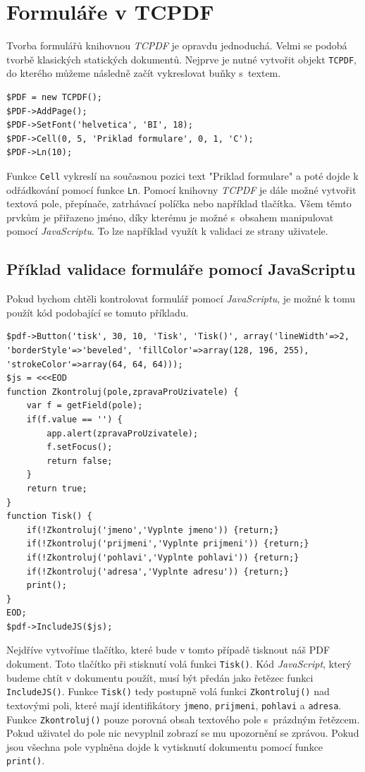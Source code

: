 \documentclass[czech,BP]{thesiskiv}
\begin{document}
\section{Formuláře v TCPDF}
Tvorba formulářů knihovnou \emph{TCPDF} je opravdu jednoduchá. Velmi se podobá tvorbě klasických statických dokumentů. Nejprve je nutné vytvořit objekt \texttt{TCPDF}, do kterého můžeme následně začít vykreslovat buňky s~textem.
\begin{lstlisting}
$PDF = new TCPDF();
$PDF->AddPage();
$PDF->SetFont('helvetica', 'BI', 18);
$PDF->Cell(0, 5, 'Priklad formulare', 0, 1, 'C');
$PDF->Ln(10);
\end{lstlisting}
Funkce \texttt{Cell} vykreslí na současnou pozici text "Priklad formulare" a poté dojde k odřádkování pomocí funkce \texttt{Ln}. Pomocí knihovny \emph{TCPDF} je dále možné vytvořit textová pole, přepínače, zatrhávací políčka nebo například tlačítka. Všem těmto prvkům je přiřazeno jméno, díky kterému je možné s~obsahem manipulovat pomocí \emph{JavaScriptu}. To lze například využít k validaci ze strany uživatele. 
\subsection{Příklad validace formuláře pomocí JavaScriptu}
Pokud bychom chtěli kontrolovat formulář pomocí \emph{JavaScriptu}, je možné k tomu použít kód podobající se tomuto příkladu. 
\begin{lstlisting}
$pdf->Button('tisk', 30, 10, 'Tisk', 'Tisk()', array('lineWidth'=>2, 'borderStyle'=>'beveled', 'fillColor'=>array(128, 196, 255), 'strokeColor'=>array(64, 64, 64)));
$js = <<<EOD
function Zkontroluj(pole,zpravaProUzivatele) {
    var f = getField(pole);
    if(f.value == '') {
        app.alert(zpravaProUzivatele);
        f.setFocus();
        return false;
    }
    return true;
}
function Tisk() {
    if(!Zkontroluj('jmeno','Vyplnte jmeno')) {return;}
    if(!Zkontroluj('prijmeni','Vyplnte prijmeni')) {return;}
    if(!Zkontroluj('pohlavi','Vyplnte pohlavi')) {return;}
    if(!Zkontroluj('adresa','Vyplnte adresu')) {return;}
    print();
}
EOD;
$pdf->IncludeJS($js);
\end{lstlisting}
Nejdříve vytvoříme tlačítko, které bude v tomto případě tisknout náš PDF dokument. Toto tlačítko při stisknutí volá funkci \texttt{Tisk()}. Kód \emph{JavaScript}, který budeme chtít v dokumentu použít, musí být předán jako řetězec funkci \texttt{IncludeJS()}. Funkce \texttt{Tisk()} tedy postupně volá funkci \texttt{Zkontroluj()} nad textovými poli, které mají identifikátory \texttt{jmeno}, \texttt{prijmeni}, \texttt{pohlavi} a \texttt{adresa}. Funkce \texttt{Zkontroluj()} pouze porovná obsah textového pole s~prázdným řetězcem. Pokud uživatel do pole nic nevyplnil zobrazí se mu upozornění se zprávou. Pokud jsou všechna pole vyplněna dojde k vytisknutí dokumentu pomocí funkce \texttt{print()}.
\end{document}
